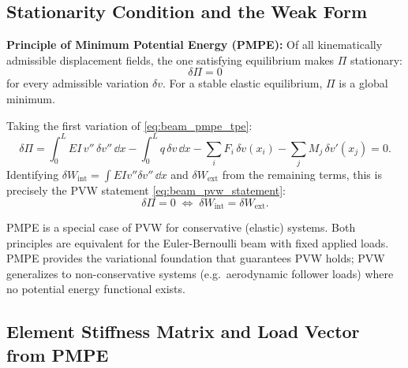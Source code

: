 \subsection{Stationarity Condition and the Weak Form}
\label{sec:beam_pmpe_stationarity}

\begin{importantbox}
\textbf{Principle of Minimum Potential Energy (PMPE):} Of all kinematically
admissible displacement fields, the one satisfying equilibrium makes $\Pi$
stationary:
\begin{equation}
    \delta\Pi = 0
\end{equation}
for every admissible variation $\delta v$. For a stable elastic equilibrium,
$\Pi$ is a global minimum.
\end{importantbox}

Taking the first variation of \cref{eq:beam_pmpe_tpe}:
\begin{equation}
    \delta\Pi
    = \int_0^L EI\,v''\,\delta v''\,\dd x
      - \int_0^L q\,\delta v\,\dd x
      - \sum_i F_i\,\delta v(x_i) - \sum_j M_j\,\delta v'(x_j)
      = 0 .
    \label{eq:beam_pmpe_first_variation}
\end{equation}
Identifying $\delta W_{\mathrm{int}} = \int EI v'' \delta v''\,\dd x$ and
$\delta W_{\mathrm{ext}}$ from the remaining terms, this is precisely the
PVW statement \cref{eq:beam_pvw_statement}:
\begin{equation}
    \delta\Pi = 0
    \;\Longleftrightarrow\;
    \delta W_{\mathrm{int}} = \delta W_{\mathrm{ext}} .
    \label{eq:beam_pmpe_pvw_link}
\end{equation}

\begin{remark}
PMPE is a special case of PVW for conservative (elastic) systems. Both
principles are equivalent for the Euler-Bernoulli beam with fixed applied
loads. PMPE provides the variational foundation that guarantees PVW holds;
PVW generalizes to non-conservative systems (e.g.\ aerodynamic follower
loads) where no potential energy functional exists.
\end{remark}

\subsection{Element Stiffness Matrix and Load Vector from PMPE}
\label{sec:beam_pmpe_matrices}

